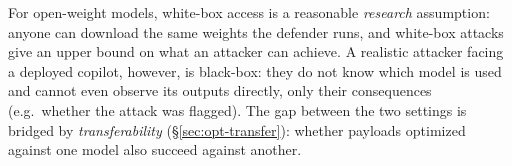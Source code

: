 For open-weight models, white-box access is a reasonable \emph{research} assumption: anyone can download the same weights the defender runs, and white-box attacks give an upper bound on what an attacker can achieve. A realistic attacker facing a deployed copilot, however, is black-box: they do not know which model is used and cannot even observe its outputs directly, only their consequences (e.g.\ whether the attack was flagged). The gap between the two settings is bridged by \emph{transferability} (\S\ref{sec:opt-transfer}): whether payloads optimized against one model also succeed against another.

